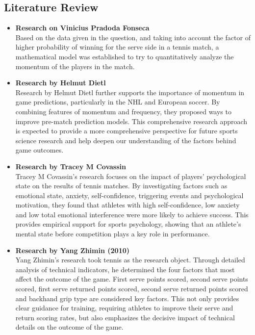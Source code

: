 \documentclass{mcmthesis}
\begin{document}
\subsection{Literature Review}
\begin{itemize}


    \item[] {\bf Research on Vinicius Pradoda Fonseca} \\
        \hspace*{2em} Based on the data given in the question, and taking into account the factor of higher probability of winning for the serve side in a tennis match, a mathematical model was established to try to quantitatively analyze the momentum of the players in the match.

    \item[] {\bf Research by Helmut Dietl} \\
        \hspace*{2em} Research by Helmut Dietl further supports the importance of momentum in game predictions, particularly in the NHL and European soccer. By combining features of momentum and frequency, they proposed ways to improve pre-match prediction models. This comprehensive research approach is expected to provide a more comprehensive perspective for future sports science research and help deepen our understanding of the factors behind game outcomes.

    \item[] {\bf Research by Tracey M Covassin} \\
        \hspace*{2em} Tracey M Covassin's research focuses on the impact of players' psychological state on the results of tennis matches. By investigating factors such as emotional state, anxiety, self-confidence, triggering events and psychological motivation, they found that athletes with high self-confidence, low anxiety and low total emotional interference were more likely to achieve success. This provides empirical support for sports psychology, showing that an athlete's mental state before competition plays a key role in performance.

    \item[] {\bf Research by Yang Zhimin (2010)} \\
        \hspace*{2em} Yang Zhimin's research took tennis as the research object. Through detailed analysis of technical indicators, he determined the four factors that most affect the outcome of the game. First serve points scored, second serve points scored, first serve returned points scored, second serve returned points scored and backhand grip type are considered key factors. This not only provides clear guidance for training, requiring athletes to improve their serve and return scoring rates, but also emphasizes the decisive impact of technical details on the outcome of the game.

\end{itemize}
\end{document}
